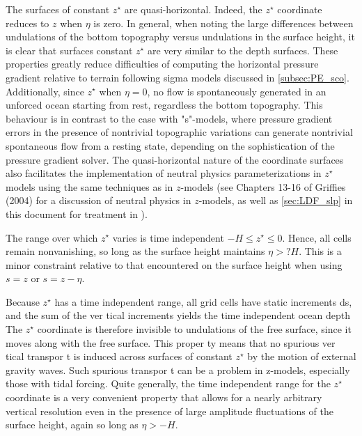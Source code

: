 \documentclass[../tex_main/NEMO_manual]{subfiles}
\begin{document}
The surfaces of constant $z^\star$ are quasi-horizontal.
Indeed, the $z^\star$ coordinate reduces to $z$ when $\eta$ is zero.
In general, when noting the large differences between undulations of the bottom topography versus undulations in
the surface height, it is clear that surfaces constant $z^\star$ are very similar to the depth surfaces.
These properties greatly reduce difficulties of computing the horizontal pressure gradient relative to
terrain following sigma models discussed in \autoref{subsec:PE_sco}. 
Additionally, since $z^\star$ when $\eta = 0$, no flow is spontaneously generated in
an unforced ocean starting from rest, regardless the bottom topography.
This behaviour is in contrast to the case with "s"-models, where pressure gradient errors in the presence of
nontrivial topographic variations can generate nontrivial spontaneous flow from a resting state,
depending on the sophistication of the pressure gradient solver.
The quasi-horizontal nature of the coordinate surfaces also facilitates the implementation of
neutral physics parameterizations in $z^\star$ models using the same techniques as in $z$-models
(see Chapters 13-16 of Griffies (2004) for a discussion of neutral physics in $z$-models,
as well as  \autoref{sec:LDF_slp} in this document for treatment in \NEMO). 

The range over which $z^\star$ varies is time independent $-H \leq z^\star \leq 0$.
Hence, all cells remain nonvanishing, so long as the surface height maintains $\eta > ?H$.
This is a minor constraint relative to that encountered on the surface height when using $s = z$ or $s = z - \eta$. 

Because $z^\star$ has a time independent range, all grid cells have static increments ds,
and the sum of the ver tical increments yields the time independent ocean depth %
The $z^\star$ coordinate is therefore invisible to undulations of the free surface,
since it moves along with the free surface.
This proper ty means that no spurious ver tical transpor t is induced across surfaces of
constant $z^\star$ by the motion of external gravity waves.
Such spurious transpor t can be a problem in z-models, especially those with tidal forcing.
Quite generally, the time independent range for the $z^\star$ coordinate is a very convenient property that
allows for a nearly arbitrary vertical resolution even in the presence of large amplitude fluctuations of
the surface height, again so long as $\eta > -H$. 



\end{document}
